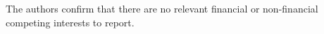 The authors confirm that there are no relevant financial or non-financial competing interests to report.
